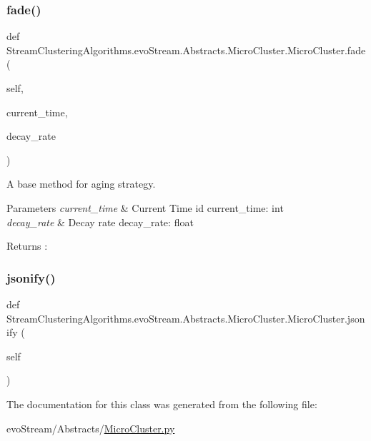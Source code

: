\subsubsection{\texorpdfstring{fade()}{fade()}}
{\footnotesize\ttfamily def Stream\+Clustering\+Algorithms.\+evo\+Stream.\+Abstracts.\+Micro\+Cluster.\+Micro\+Cluster.\+fade (\begin{DoxyParamCaption}\item[{}]{self,  }\item[{}]{current\+\_\+time,  }\item[{}]{decay\+\_\+rate }\end{DoxyParamCaption})}



A base method for aging strategy. 


\begin{DoxyParams}{Parameters}
{\em current\+\_\+time} & Current Time id  current\+\_\+time\+: int \\
\hline
{\em decay\+\_\+rate} & Decay rate  decay\+\_\+rate\+: float \\
\hline
\end{DoxyParams}
\begin{DoxyReturn}{Returns}
\+: 
\end{DoxyReturn}
\mbox{\label{classStreamClusteringAlgorithms_1_1evoStream_1_1Abstracts_1_1MicroCluster_1_1MicroCluster_a039c2ba63997e742f0a9947340263745}} 
\subsubsection{\texorpdfstring{jsonify()}{jsonify()}}
{\footnotesize\ttfamily def Stream\+Clustering\+Algorithms.\+evo\+Stream.\+Abstracts.\+Micro\+Cluster.\+Micro\+Cluster.\+jsonify (\begin{DoxyParamCaption}\item[{}]{self }\end{DoxyParamCaption})}



The documentation for this class was generated from the following file\+:\begin{DoxyCompactItemize}
\item 
evo\+Stream/\+Abstracts/\hyperlink{MicroCluster_8py}{Micro\+Cluster.\+py}\end{DoxyCompactItemize}
